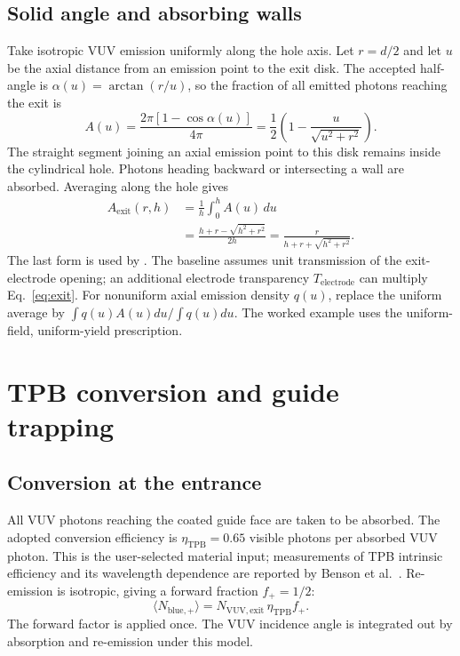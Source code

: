 \documentclass[11pt,a4paper]{article}
\newcommand{\code}[1]{\path{#1}}
\begin{document}
\subsection{Solid angle and absorbing walls}
Take isotropic VUV emission uniformly along the hole axis. Let $r=d/2$ and
let $u$ be the axial distance from an emission point to the exit disk.
The accepted half-angle is $\alpha(u)=\arctan(r/u)$, so the fraction of all
emitted photons reaching the exit is
\begin{equation}
 A(u)=\frac{2\pi[1-\cos\alpha(u)]}{4\pi}
 =\frac12\left(1-\frac{u}{\sqrt{u^2+r^2}}\right).
\end{equation}
The straight segment joining an axial emission point to this disk remains
inside the cylindrical hole. Photons heading backward or intersecting a
wall are absorbed. Averaging along the hole gives
\begin{align}
 A_{\mathrm{exit}}(r,h)
 &=\frac{1}{h}\int_0^h A(u)\,du\\
 &=\frac{h+r-\sqrt{h^2+r^2}}{2h}
 =\frac{r}{h+r+\sqrt{h^2+r^2}}.
 \label{eq:exit}
\end{align}
The last form is used by \code{axial_light_acceptance}. The baseline assumes
unit transmission of the exit-electrode opening; an additional electrode
transparency $T_{\mathrm{electrode}}$ can multiply Eq.~\eqref{eq:exit}.
For nonuniform axial emission density $q(u)$, replace the uniform average by
$\int q(u)A(u)du/\int q(u)du$. The worked example uses the uniform-field,
uniform-yield prescription.

\section{TPB conversion and guide trapping}
\subsection{Conversion at the entrance}
All VUV photons reaching the coated guide face are taken to be absorbed.
The adopted conversion efficiency is $\eta_{\mathrm{TPB}}=0.65$ visible photons
per absorbed VUV photon. This is the user-selected material input;
measurements of TPB intrinsic efficiency and its wavelength dependence are
reported by Benson et al.~\cite{Benson2018TPB}.
Re-emission is isotropic, giving a forward fraction $f_+=1/2$:
\begin{equation}
 \langle N_{\mathrm{blue},+}\rangle
 =N_{\mathrm{VUV,exit}}\,\eta_{\mathrm{TPB}} f_+.
\end{equation}
The forward factor is applied once. The VUV incidence angle is integrated
out by absorption and re-emission under this model.
\end{document}
